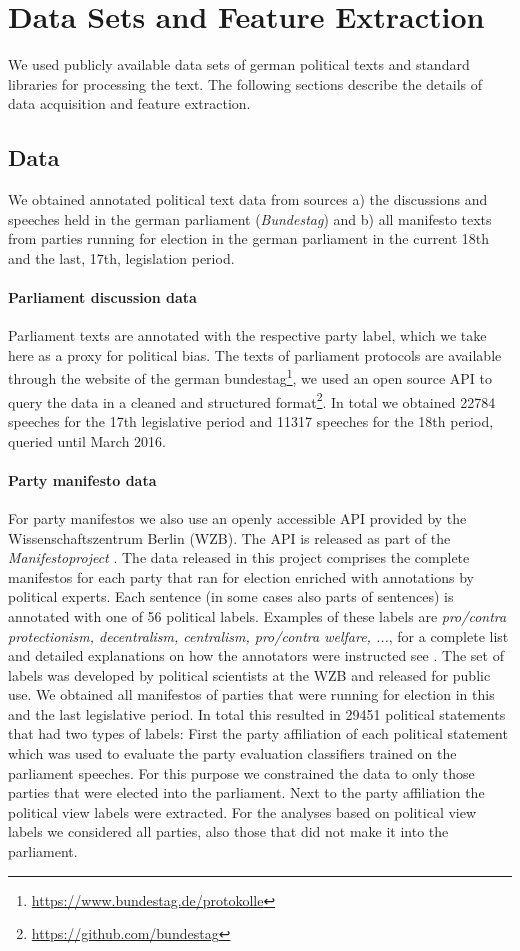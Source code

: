 \documentclass[runningheads,a4paper]{llncs}
\begin{document}
\section{Data Sets and Feature Extraction}\label{sec:data}
%
We used publicly available data sets of german political texts and standard libraries for processing the text. The following sections describe the details of data acquisition and feature extraction. 

\subsection{Data}
We obtained annotated political text data from sources a) the discussions and speeches held in the german parliament ({\em Bundestag}) and b) all manifesto texts from parties running for election in the german parliament in the current 18th and the last, 17th, legislation period.

\paragraph{Parliament discussion data} Parliament texts are annotated with the respective party label, which we take here as a proxy for political bias. The texts of parliament protocols are available through the website of the german bundestag\footnote{\url{https://www.bundestag.de/protokolle}}, we used an open source API to query the data in a cleaned and structured format\footnote{\url{https://github.com/bundestag}}. In total we obtained 22784 speeches for the 17th legislative period and 11317 speeches for the 18th period, queried until March 2016. 

\paragraph{Party manifesto data}
For party manifestos we also use an openly accessible API provided by the Wissenschaftszentrum Berlin (WZB). The API is released as part of the {\em Manifestoproject} \cite{manifesto}. The data released in this project comprises the complete manifestos for each party that ran for election enriched with annotations by political experts. Each sentence (in some cases also parts of sentences) is annotated with one of 56 political labels. Examples of these labels are {\em pro/contra protectionism, decentralism, centralism, pro/contra welfare, ...}, for a complete list and detailed explanations on how the annotators were instructed see \cite{leftright}. The set of labels was developed by political scientists at the WZB and released for public use. We obtained all manifestos of parties that were running for election in this and the last legislative period. In total this resulted in 29451 political statements that had two types of labels: First the party affiliation of each political statement which was used to evaluate the party evaluation classifiers trained on the parliament speeches. For this purpose we constrained the data to only those parties that were elected into the parliament. Next to the party affiliation the political view labels were extracted. For the analyses based on political view labels we considered all parties, also those that did not make it into the parliament. 
\end{document}
